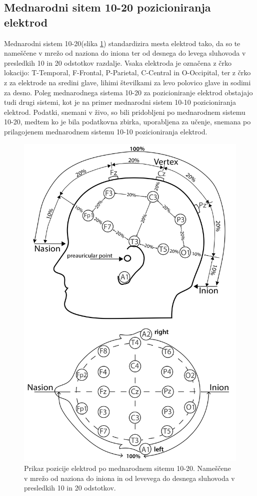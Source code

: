 \subsection{Mednarodni sitem 10-20 pozicioniranja elektrod}
Mednarodni sistem 10-20(slika \ref{slika:mednarodni_sistem_20}) standardizira mesta elektrod tako, da so te  nameščene v mrežo od naziona do iniona ter od desnega do levega sluhovoda v presledkih 10 in 20 odstotkov razdalje. Vsaka elektroda je označena z črko lokacijo: T-Temporal, F-Frontal, P-Parietal, C-Central in O-Occipital, ter z črko z za elektrode na sredini glave, lihimi številkami za levo polovico glave in sodimi za desno. \cite{klemTentwentyElectrodeSystem1999} Poleg mednarodnega sistema 10-20 za pozicioniranje elektrod obstajajo tudi drugi sistemi, kot je na primer mednarodni sistem 10-10 pozicioniranja elektrod. Podatki, snemani v živo, so bili pridobljeni po mednarodnem sistemu 10-20, medtem ko je bila podatkovna zbirka, uporabljena za učenje, snemana po prilagojenem mednarodnem sistemu 10-10 pozicioniranja elektrod.
\begin{figure}[h!]
    \begin{center}
    \includegraphics[width=0.7\linewidth]{slike/1020-diagram1.jpg}
    \end{center}
    \caption{Prikaz pozicije elektrod po mednarodnem sitemu 10-20. Nameščene v mrežo od naziona do iniona in od levevega do desnega sluhovoda v presledkih 10 in 20 odstotkov. \cite{ElectrodeArrangementAccording}}
    \label{slika:mednarodni_sistem_20}
    \end{figure}

